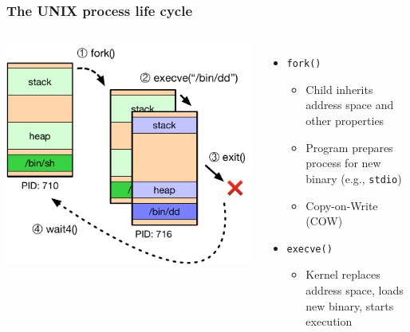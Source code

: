 \documentclass[pdftex]{beamer} %
\begin{document}
\begin{frame}
  \frametitle{The UNIX process life cycle}

  \begin{columns}[T]
      \vspace{0.5cm}
      \includegraphics[width=\textwidth]{../../figures/process-life-cycle.pdf}

    \begin{itemize}

      \pause

      \item \texttt{fork()}
      \begin{itemize}
	\item Child inherits address space and other properties
	\item Program prepares process for new binary (e.g., \texttt{stdio})
	\item Copy-on-Write (COW)
      \end{itemize}

      \pause

      \item \texttt{execve()}
      \begin{itemize}
	\item Kernel replaces address space, loads new binary, starts execution
      \end{itemize}


\end{itemize}
\end{columns}
\end{frame}
\end{document}
